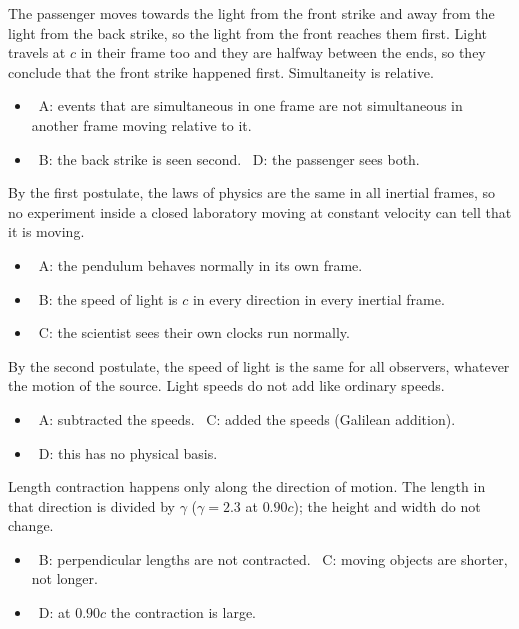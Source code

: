 \documentclass[12pt]{article}
\begin{document}
\begin{practiceanswers}
\begin{practiceans}
  The passenger moves towards the light from the front strike and away from the light from the back
  strike, so the light from the front reaches them first. Light travels at $c$ in their frame too and
  they are halfway between the ends, so they conclude that the front strike happened first.
  Simultaneity is relative.
  \begin{itemize}
    \item \xmark\ A: events that are simultaneous in one frame are not simultaneous in another frame
          moving relative to it.
    \item \xmark\ B: the back strike is seen second. \quad \xmark\ D: the passenger sees both.
  \end{itemize}
\end{practiceans}

\begin{practiceans}
  By the first postulate, the laws of physics are the same in all inertial frames, so no experiment
  inside a closed laboratory moving at constant velocity can tell that it is moving.
  \begin{itemize}
    \item \xmark\ A: the pendulum behaves normally in its own frame.
    \item \xmark\ B: the speed of light is $c$ in every direction in every inertial frame.
    \item \xmark\ C: the scientist sees their own clocks run normally.
  \end{itemize}
\end{practiceans}

\begin{practiceans}
  By the second postulate, the speed of light is the same for all observers, whatever the motion of the
  source. Light speeds do not add like ordinary speeds.
  \begin{itemize}
    \item \xmark\ A: subtracted the speeds. \quad \xmark\ C: added the speeds (Galilean addition).
    \item \xmark\ D: this has no physical basis.
  \end{itemize}
\end{practiceans}

\begin{practiceans}
  Length contraction happens only along the direction of motion. The length in that direction is
  divided by $\gamma$ ($\gamma = 2.3$ at $0.90c$); the height and width do not change.
  \begin{itemize}
    \item \xmark\ B: perpendicular lengths are not contracted. \quad \xmark\ C: moving objects are
          shorter, not longer.
    \item \xmark\ D: at $0.90c$ the contraction is large.
  \end{itemize}
\end{practiceans}


\end{practiceanswers}
\end{document}
